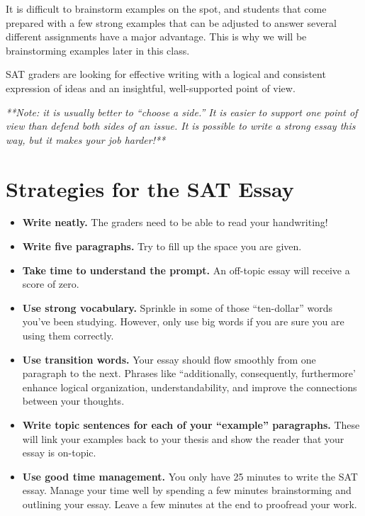 \bigskip
It is difficult to brainstorm examples on the spot, and students that come prepared with a few strong examples that can be adjusted to answer several different assignments have a major advantage. This is why we will be brainstorming examples later in this class. 

\bigskip
SAT graders are looking for effective writing with a logical and consistent expression of ideas and an insightful, well-supported point of view.

\bigskip
\textit{**Note: it is usually better to “choose a side.”  It is easier to support one point of view than defend both sides of an issue.  It is possible to write a strong essay this way, but it makes your job harder!**}

\pagebreak
\section{Strategies for the SAT Essay}    %
\begin{itemize}
\vfill
\item{\textbf{Write neatly.}  The graders need to be able to read your handwriting!}
\vfill

\item{\textbf{Write five paragraphs.}  Try to fill up the space you are given.}


\vfill
\item{\textbf{Take time to understand the prompt.}  An off-topic essay will receive a score of zero.}

\vfill
\item{\textbf{Use strong vocabulary.}  Sprinkle in some of those “ten-dollar” words you've been studying.  However, only use big words if you are sure you are using them correctly.}
\vfill

\item{\textbf{Use transition words.}  Your essay should flow smoothly from one paragraph to the next.  Phrases like ``additionally, consequently, furthermore' enhance logical organization, understandability, and improve the connections between your thoughts.}

\vfill

\item{\textbf{Write topic sentences for each of your “example” paragraphs.}  These will link your examples back to your thesis and show the reader that your essay is on-topic.  }

\vfill
\item{\textbf{Use good time management.} You only have 25 minutes to write the SAT essay.  Manage your time well by spending a few minutes brainstorming and outlining your essay.  Leave a few minutes at the end to proofread your work.}
\end{itemize}

